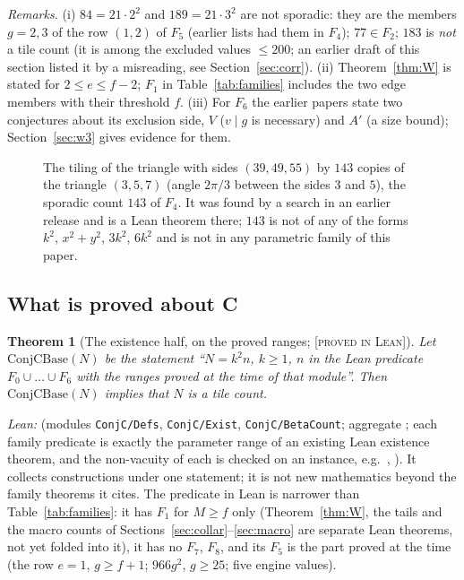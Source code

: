 \documentclass[11pt,reqno]{amsart}
\theoremstyle{plain}
\newtheorem{theorem}{Theorem}[section]
\theoremstyle{definition}
\newcommand{\lab}[1]{\textup{[\textsc{#1}]}}
\newcommand{\PL}{\lab{proved in Lean}}
\newcommand{\FIGSLOT}[1]{\begin{center}\fbox{\parbox{0.88\linewidth}{\centering\vspace{3.5em}\textsf{[figure slot: #1]}\vspace{3.5em}}}\end{center}}
\begin{document}
\emph{Remarks.} (i) $84=21\cdot2^2$ and $189=21\cdot3^2$ are not sporadic: they are the members $g=2,3$ of the row $(1,2)$ of $F_5$ (earlier lists had them in $F_4$); $77\in F_2$; $183$ is \emph{not} a tile count (it is among the excluded values $\le200$; an earlier draft of this section listed it by a misreading, see Section~\ref{sec:corr}).
(ii) Theorem~\ref{thm:W} is stated for $2\le e\le f-2$; $F_1$ in Table~\ref{tab:families} includes the two edge members with their threshold $f$.
(iii) For $F_6$ the earlier papers state two conjectures about its exclusion side, $V$ ($v\mid g$ is necessary) and $A'$ (a size bound); Section~\ref{sec:w3} gives evidence for them.

\begin{figure}[ht]
\FIGSLOT{t143}
\caption{The tiling of the triangle with sides $(39,49,55)$ by $143$ copies of the triangle $(3,5,7)$ (angle $2\pi/3$ between the sides $3$ and $5$), the sporadic count $143$ of $F_4$. It was found by a search in an earlier release and is a Lean theorem there; $143$ is not of any of the forms $k^2$, $x^2+y^2$, $3k^2$, $6k^2$ and is not in any parametric family of this paper.}
\end{figure}

\subsection{What is proved about C}
\begin{theorem}[The existence half, on the proved ranges; \PL{}]\label{thm:Cexist}
Let $\mathrm{ConjCBase}(N)$ be the statement ``$N=k^2n$, $k\ge1$, $n$ in the Lean predicate $F_0\cup\dots\cup F_6$ with the ranges proved at the time of that module''. Then $\mathrm{ConjCBase}(N)$ implies that $N$ is a tile count.
\end{theorem}
\emph{Lean:}  (modules \texttt{ConjC/Defs}, \texttt{ConjC/Exist}, \texttt{ConjC/BetaCount}; aggregate ; each family predicate is exactly the parameter range of an existing Lean existence theorem, and the non-vacuity of each is checked on an instance, e.g.\ , ). It collects constructions under one statement; it is not new mathematics beyond the family theorems it cites.
The predicate in Lean is narrower than Table~\ref{tab:families}: it has $F_1$ for $M\ge f$ only (Theorem~\ref{thm:W}, the tails and the macro counts of Sections~\ref{sec:collar}--\ref{sec:macro} are separate Lean theorems, not yet folded into it), it has no $F_7$, $F_8$, and its $F_5$ is the part proved at the time (the row $e=1$, $g\ge f+1$; $966g^2$, $g\ge25$; five engine values).
\end{document}
